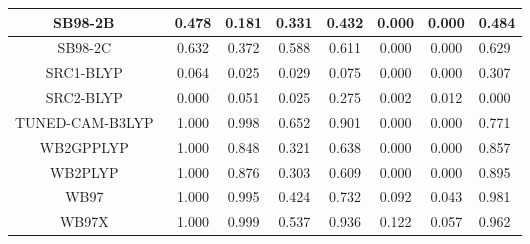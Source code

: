 \begin{tabular}{|c|c|c|c|c|c|c|l|}
                                 SB98-2B~\cite{Schmider1998_9624} &                0.478 &                          0.181 &             0.331 &                        0.432 &                0.000 &                0.000 &                       0.484 \\ \hline
                                 SB98-2C~\cite{Schmider1998_9624} &                0.632 &                          0.372 &             0.588 &                        0.611 &                0.000 &                0.000 &                       0.629 \\ \hline
                                SRC1-BLYP~\cite{Besley2009_10350} &                0.064 &                          0.025 &             0.029 &                        0.075 &                0.000 &                0.000 &                       0.307 \\ \hline
                                SRC2-BLYP~\cite{Besley2009_10350} &                0.000 &                          0.051 &             0.025 &                        0.275 &                0.002 &                0.012 &                       0.000 \\ \hline
                              TUNED-CAM-B3LYP~\cite{Okuno2012_29} &                1.000 &                          0.998 &             0.652 &                        0.901 &                0.000 &                0.000 &                       0.771 \\ \hline
                           WB2GPPLYP~\cite{CasanovaPaez2019_4735} &                1.000 &                          0.848 &             0.321 &                        0.638 &                0.000 &                0.000 &                       0.857 \\ \hline
                             WB2PLYP~\cite{CasanovaPaez2019_4735} &                1.000 &                          0.876 &             0.303 &                        0.609 &                0.000 &                0.000 &                       0.895 \\ \hline
                                      WB97~\cite{Chai2008_084106} &                1.000 &                          0.995 &             0.424 &                        0.732 &                0.092 &                0.043 &                       0.981 \\ \hline
                                     WB97X~\cite{Chai2008_084106} &                1.000 &                          0.999 &             0.537 &                        0.936 &                0.122 &                0.057 &                       0.962 \\ \hline

\end{tabular}
